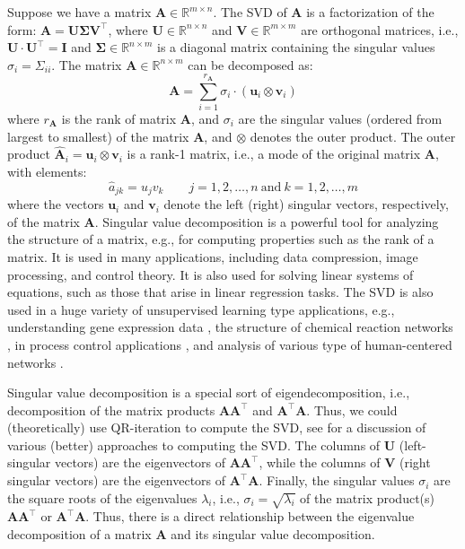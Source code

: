 \documentclass{article}[11pt]
\def\R{\mathbb{R}}
\begin{document}
Suppose we have a matrix $\mathbf{A} \in \R^{m \times n}$. The SVD of $\mathbf{A}$ is a factorization of the form: $\mathbf{A} = \mathbf{U}\mathbf{\Sigma}\mathbf{V}^{\top}$, where
$\mathbf{U}\in\mathbb{R}^{n\times{n}}$ and $\mathbf{V}\in\mathbb{R}^{m\times{m}}$ are orthogonal matrices, i.e., $\mathbf{U}\cdot\mathbf{U}^{\top} = \mathbf{I}$ and $\mathbf{\Sigma}\in\mathbb{R}^{n\times{m}}$ is a diagonal matrix containing 
the singular values $\sigma_{i}=\Sigma_{ii}$. The matrix $\mathbf{A}\in\mathbb{R}^{n\times{m}}$ can be decomposed as:
\begin{equation}
\mathbf{A} = \sum_{i=1}^{r_{\mathbf{A}}}\sigma_{i}\cdot\left(\mathbf{u}_{i}\otimes\mathbf{v}_{i}\right)
\end{equation}
where $r_{\mathbf{A}}$ is the rank of matrix $\mathbf{A}$, and $\sigma_{i}$ are the singular values (ordered from largest to smallest) of the matrix $\mathbf{A}$,
and $\otimes$ denotes the outer product. 
The outer product $\hat{\mathbf{A}}_{i} = \mathbf{u}_{i}\otimes\mathbf{v}_{i}$ is a rank-1 matrix, i.e., a mode of the original matrix $\mathbf{A}$,  with elements: 
\begin{equation}
\hat{a}_{jk} = u_{j}v_{k}\qquad{j=1,2,\dots,n~\text{and}~k=1,2,\dots,m}
\end{equation}
where the vectors $\mathbf{u}_{i}$ and $\mathbf{v}_{i}$ denote the left (right) singular vectors, respectively, of the matrix $\mathbf{A}$.
Singular value decomposition is a powerful tool for analyzing the structure of a matrix, e.g., for computing properties such as the rank of a matrix. It is used in many applications, 
including data compression, image processing, and control theory. It is also used for solving linear systems of equations,
such as those that arise in linear regression tasks. The SVD is also used in a huge variety of unsupervised learning type applications, e.g., understanding gene expression data \citep{Alter:2000aa, Alter:2006},  
the structure of chemical reaction networks \citep{Famili:2003aa}, 
in process control applications \citep{MooreSVD1986}, and analysis of various type of human-centered networks \citep{SASTRY20075275, 7993780}.

Singular value decomposition is a special sort of eigendecomposition, i.e., decomposition of the matrix products $\mathbf{A}\mathbf{A}^{\top}$ and $\mathbf{A}^{\top}\mathbf{A}$.
Thus, we could (theoretically) use QR-iteration to compute the SVD, see \citep{Cline2006ComputationOT} for a discussion of various (better) approaches to computing the SVD.
The columns of $\mathbf{U}$ (left-singular vectors) are the eigenvectors of $\mathbf{A}\mathbf{A}^{\top}$, 
while the columns of $\mathbf{V}$ (right singular vectors) are the eigenvectors of $\mathbf{A}^{\top}\mathbf{A}$.
Finally, the singular values $\sigma_{i}$ are the square roots of the eigenvalues $\lambda_{i}$, i.e., $\sigma_{i} = \sqrt{\lambda_{i}}$ of the matrix product(s) $\mathbf{A}\mathbf{A}^{\top}$ or $\mathbf{A}^{\top}\mathbf{A}$. 
Thus, there is a direct relationship between the eigenvalue decomposition of a matrix $\mathbf{A}$ and its singular value decomposition.
\end{document}
